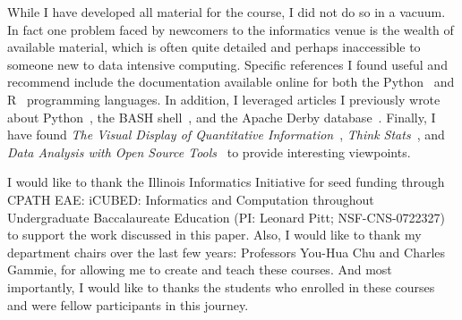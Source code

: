 \documentclass[11pt,twoside]{article}
\begin{document}
While I have developed all material for the course, I did not do so in a vacuum. In fact one problem faced by newcomers to the informatics venue is the wealth of available material, which is often quite detailed and perhaps inaccessible to someone new to data intensive computing. Specific references I found useful and recommend include the documentation available online for both the Python~\citep{python} and R~\citep{rproject} programming languages. In addition, I leveraged articles I previously wrote about Python~\citep{rjbpython}, the BASH shell~\citep{rjbbash}, and the Apache Derby database~\citep{rjbderby}. Finally, I have found {\em The Visual Display of Quantitative Information}~\citep{tufte09}, {\em Think Stats}~\citep{downey11}, and {\em Data Analysis with Open Source Tools}~\citep{janert10} to provide interesting viewpoints. 

\acknowledgements I would like to thank the Illinois Informatics Initiative for seed funding through CPATH EAE: iCUBED: Informatics and Computation throughout Undergraduate Baccalaureate Education (PI: Leonard Pitt; NSF-CNS-0722327) to support the work discussed in this paper. Also, I would like to thank my department chairs over the last few years: Professors You-Hua Chu and Charles Gammie, for allowing me to create and teach these courses. And most importantly, I would like to thanks the students who enrolled in these courses and were fellow participants in this journey.


\end{document}
